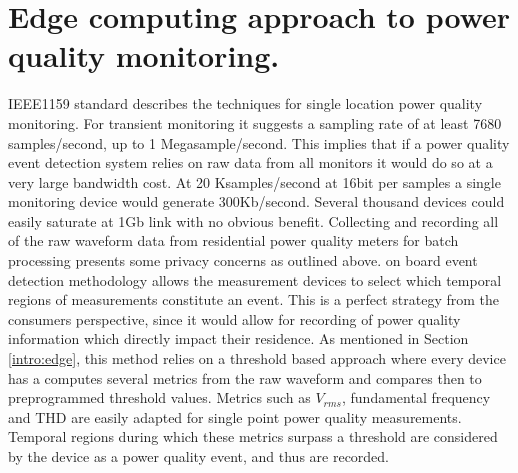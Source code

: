 \section{Edge computing approach to power quality monitoring.}

IEEE1159 standard describes the techniques for single location power quality monitoring. For transient monitoring it suggests a sampling rate of at least 7680 samples/second, up to 1 Megasample/second. This implies that if a power quality event detection system relies on raw data from all monitors it would do so at a very large bandwidth cost. At 20 Ksamples/second at 16bit per samples a single monitoring device would generate 300Kb/second. Several thousand devices could easily saturate at 1Gb link with no obvious benefit. Collecting and recording all of the raw waveform data from residential power quality meters for batch processing presents some privacy concerns as outlined above. on board event detection methodology allows the measurement devices to select which temporal regions of measurements constitute an event. This is a perfect strategy from the consumers perspective, since it would allow for recording of power quality information which directly impact their residence. As mentioned in Section \ref{intro:edge}, this method relies on a threshold based approach where every device has a computes several metrics from the raw waveform and compares then to preprogrammed threshold values. Metrics such as $V_{rms}$, fundamental frequency and THD are easily adapted for single point power quality measurements. Temporal regions during which these metrics surpass a threshold are considered by the device as a power quality event, and thus are recorded. 

